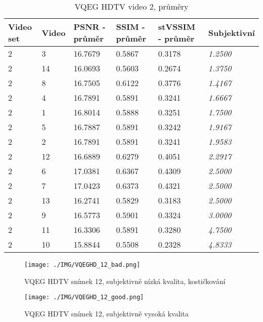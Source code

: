 \documentclass[thesis=M,czech]{FITthesis}[2016/06/26]
\begin{document}
\begin{table}[]
\centering
\begin{tabular}{|p{1cm}|p{1cm}|p{1.3cm}|p{1.3cm}|p{1.5cm}|p{1.8cm}|}
\hline
Video set & Video & PSNR - průměr & SSIM - průměr & stVSSIM - průměr & Subjektivní \\ \hline
2         & 3     & 16.7679       & 0.5867        & 0.3178           & \textit{1.2500}      \\ \hline
2         & 14    & 16.0693       & 0.5603        & 0.2674           & \textit{1.3750}      \\ \hline
2         & 8     & 16.7505       & 0.6122        & 0.3776           & \textit{1.4167}      \\ \hline
2         & 4     & 16.7891       & 0.5891        & 0.3241           & \textit{1.6667}      \\ \hline
2         & 1     & 16.8014       & 0.5888        & 0.3251           & \textit{1.7500}      \\ \hline
2         & 5     & 16.7887       & 0.5891        & 0.3242           & \textit{1.9167}      \\ \hline
2         & 2     & 16.7891       & 0.5891        & 0.3241           & \textit{1.9583}      \\ \hline
2         & 12    & 16.6889       & 0.6279        & 0.4051           & \textit{2.2917}      \\ \hline
2         & 6     & 17.0381       & 0.6367        & 0.4309           & \textit{2.5000}      \\ \hline
2         & 7     & 17.0423       & 0.6373        & 0.4321           & \textit{2.5000}      \\ \hline
2         & 13    & 16.2741       & 0.5829        & 0.3183           & \textit{2.5000}      \\ \hline
2         & 9     & 16.5773       & 0.5901        & 0.3324           & \textit{3.0000}      \\ \hline
2         & 11    & 16.3306       & 0.5891        & 0.3280           & \textit{4.7500}      \\ \hline
2         & 10    & 15.8844       & 0.5508        & 0.2328           & \textit{4.8333}      \\ \hline
\end{tabular}
\caption{VQEG HDTV video 2, průměry}
\label{tab:VQEGHD1_2_avg}
\end{table}


\begin{figure}[]\centering
\texttt{[image: ./IMG/VQEGHD\_12\_bad.png]}
\caption{VQEG HDTV snímek 12, subjektivně nízká kvalita, kostičkování}
\label{fig:VQEGHD_12_bad}
\end{figure}
\begin{figure}[]\centering
\texttt{[image: ./IMG/VQEGHD\_12\_good.png]}
\caption{VQEG HDTV snímek 12, subjektivně vysoká kvalita}
\label{fig:VQEGHD_12_good}
\end{figure}
\end{document}
